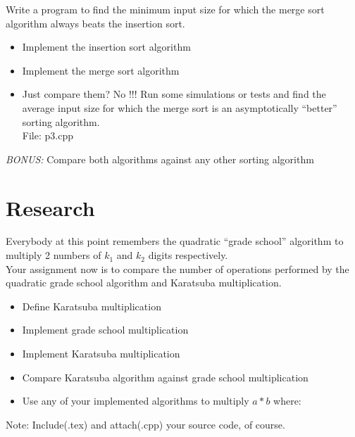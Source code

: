 \documentclass[12pt]{article}
\begin{document}
Write a program to find the minimum input size for which the merge sort algorithm always beats the insertion sort.

\begin{itemize}
    \item Implement the insertion sort algorithm
    \item Implement the merge sort algorithm
    \item Just compare them? No !!! Run some simulations or tests and find the average input size for which the merge sort is an asymptotically ``better'' sorting algorithm.
    \\
    File: p3.cpp
\end{itemize}



\emph{BONUS:} Compare both algorithms against any other sorting algorithm

\section{Research}

Everybody at this point remembers the quadratic ``grade school'' algorithm to multiply 2 numbers of $k_{1}$ and $k_{2}$ digits respectively. \\

Your assignment now is to compare the number of operations performed by the quadratic grade school algorithm and Karatsuba multiplication.

\begin{itemize}
    \item Define Karatsuba multiplication
    \item Implement grade school multiplication
    \item Implement Karatsuba multiplication
    \item Compare Karatsuba algorithm against grade school multiplication
    \item Use any of your implemented algorithms to multiply $a*b$ where:
\end{itemize}

Note: Include(.tex) and attach(.cpp) your source code, of course.\\
\end{document}
